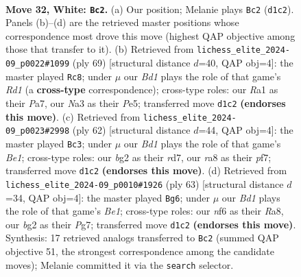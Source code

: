 \documentclass[11pt]{article}
\begin{document}
\clearpage

\begin{figure}[p]\centering
\begin{subfigure}{0.46\textwidth}\centering
\resizebox{\linewidth}{!}{%
\newchessgame
\chessboard[
  setfen={r7/p1pp2k1/1p3n2/5p1p/2P2P2/NP6/P2PK1bP/R2B4 w - - 2 32},
  showmover=false,
  pgfstyle=straightmove, color=movearrow, markmove={d1-c2}
]}
\caption{}
\end{subfigure}\hfill
\begin{subfigure}{0.46\textwidth}\centering
\resizebox{\linewidth}{!}{%
\newchessgame
\chessboard[
  setfen={3r2k1/pp4pp/5p2/4p3/PP1bP3/1R3PP1/3BK2P/8 b - - 6 35},
  showmover=false,
  pgfstyle=straightmove, color=movearrow, markmove={d8-c8}
]}
\caption{}
\end{subfigure}
\\[4pt]
\begin{subfigure}{0.46\textwidth}\centering
\resizebox{\linewidth}{!}{%
\newchessgame
\chessboard[
  setfen={5k2/p2r1p2/1pn2pp1/7p/P1P5/1P5P/4KPP1/1R2B3 w - - 1 32},
  showmover=false,
  pgfstyle=straightmove, color=movearrow, markmove={e1-c3}
]}
\caption{}
\end{subfigure}\hfill
\begin{subfigure}{0.46\textwidth}\centering
\resizebox{\linewidth}{!}{%
\newchessgame
\chessboard[
  setfen={r3b3/6pk/p1p1B2p/6p1/8/P2N2bP/1PP3P1/5R1K b - - 1 32},
  showmover=false,
  pgfstyle=straightmove, color=movearrow, markmove={e8-g6}
]}
\caption{}
\end{subfigure}
\caption{\textbf{Move 32, White: \texttt{Bc2}.} (a) Our position; Melanie plays \texttt{Bc2} (\texttt{d1c2}). Panels (b)--(d) are the retrieved master positions whose correspondence most drove this move (highest QAP objective among those that transfer to it). (b) Retrieved from \texttt{lichess\_elite\_2024-09\_p0022\#1099} (ply 69) [structural distance $d$=40, QAP obj=4]: the master played \texttt{Rc8}; under $\mu$ our \emph{Bd1} plays the role of that game's \emph{Rd1} (a \textbf{cross-type} correspondence); cross-type roles: our \emph{R}a1 as their \emph{P}a7, our \emph{N}a3 as their \emph{P}e5; transferred move \texttt{d1c2} \textbf{(endorses this move)}. (c) Retrieved from \texttt{lichess\_elite\_2024-09\_p0023\#2998} (ply 62) [structural distance $d$=44, QAP obj=4]: the master played \texttt{Bc3}; under $\mu$ our \emph{Bd1} plays the role of that game's \emph{Be1}; cross-type roles: our \emph{b}g2 as their \emph{r}d7, our \emph{r}a8 as their \emph{p}f7; transferred move \texttt{d1c2} \textbf{(endorses this move)}. (d) Retrieved from \texttt{lichess\_elite\_2024-09\_p0010\#1926} (ply 63) [structural distance $d$=34, QAP obj=4]: the master played \texttt{Bg6}; under $\mu$ our \emph{Bd1} plays the role of that game's \emph{Be1}; cross-type roles: our \emph{n}f6 as their \emph{R}a8, our \emph{b}g2 as their \emph{P}g7; transferred move \texttt{d1c2} \textbf{(endorses this move)}. Synthesis: 17 retrieved analogs transferred to \texttt{Bc2} (summed QAP objective 51, the strongest correspondence among the candidate moves); Melanie committed it via the \texttt{search} selector.}
\label{fig:thought-m62}
\end{figure}
\end{document}
